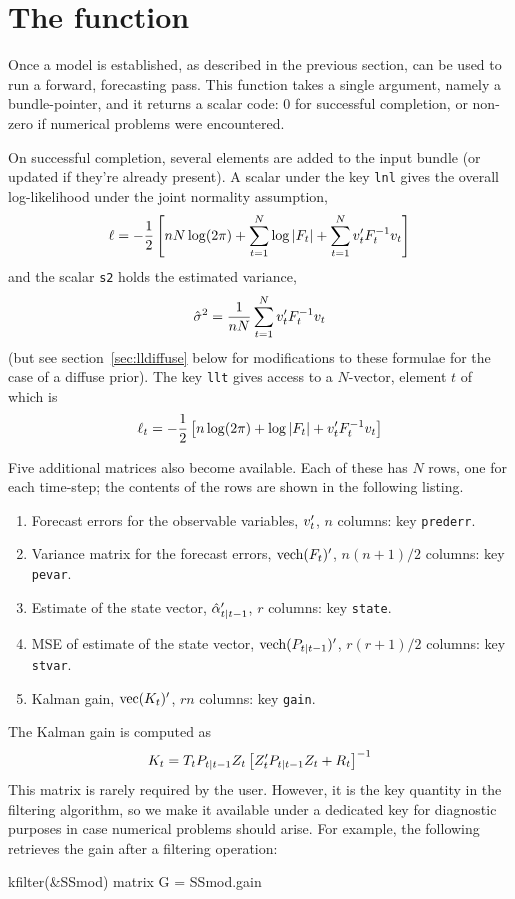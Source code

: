 \section{The  function}
\label{sec:kfilter}

Once a model is established, as described in the previous section,
 can be used to run a forward, forecasting pass.  This
function takes a single argument, namely a bundle-pointer, and it
returns a scalar code: 0 for successful completion, or non-zero if
numerical problems were encountered.

On successful completion, several elements are added to the input
bundle (or updated if they're already present).  A scalar under the
key \texttt{lnl} gives the overall log-likelihood under the joint
normality assumption,
%
\[
  \ell = -\frac{1}{2} \left[nN \log(2 \pi) + \sum_{t=1}^N\log \left|F_t\right| +
    \sum_{t=1}^Nv_t'F_t^{-1} v_t
  \right]
\]
%
and the scalar \texttt{s2} holds the estimated variance,
%
\[
\hat{\sigma}^2 = \frac{1}{nN}
   \sum_{t=1}^Nv_t'F_t^{-1} v_t
\]
(but see section~\ref{sec:lldiffuse} below for modifications to these
formulae for the case of a diffuse prior).  The key \texttt{llt} gives
access to a $N$-vector, element $t$ of which is
%
\[
  \ell_t = -\frac{1}{2} \left[n \log(2 \pi) + \log \left|F_t\right| +
    v_t'F_t^{-1} v_t
  \right]
\]
%

Five additional matrices also become available.  Each of these has $N$
rows, one for each time-step; the contents of the rows are shown in
the following listing.
%
\begin{enumerate}
\item Forecast errors for the observable variables, $v_t'$, $n$
  columns: key \texttt{prederr}.
\item Variance matrix for the forecast errors, $\mbox{vech}(F_t)'$,
  $n(n+1)/2$ columns: key \texttt{pevar}.
\item Estimate of the state vector, $\hat{\alpha}_{t|t-1}'$, $r$
  columns: key \texttt{state}.
\item MSE of estimate of the state vector,
  $\mbox{vech}(P_{t|t-1})'$, $r(r+1)/2$ columns: key \texttt{stvar}.
\item Kalman gain, $\mbox{vec}(K_t)'$, $rn$ columns: key
  \texttt{gain}.
\end{enumerate}

The Kalman gain is computed as
\[
K_t = T_t P_{t|t-1} Z_t
\left[Z_t' P_{t|t-1} Z_t + R_t\right]^{-1}
\]
This matrix is rarely required by the user. However, it is the key
quantity in the filtering algorithm, so we make it available under a
dedicated key for diagnostic purposes in case numerical problems
should arise. For example, the following retrieves the gain after a
filtering operation:
%
\begin{code}
kfilter(&SSmod)
matrix G = SSmod.gain
\end{code}

